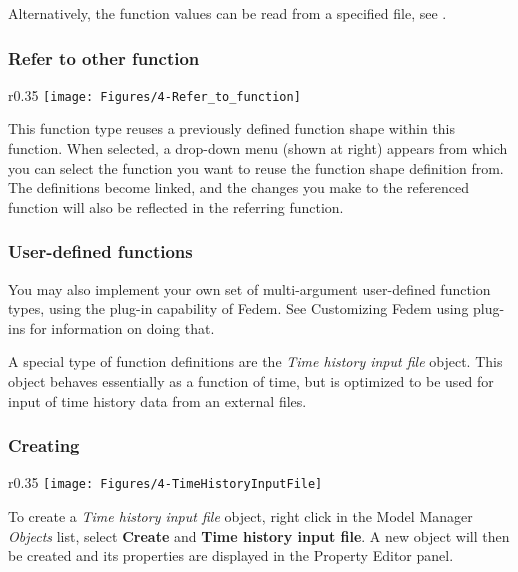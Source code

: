 Alternatively, the function values can be read from a specified file, see
.

\subsubsection{Refer to other function}

\begin{wrapfigure}[4]{r}{0.35\textwidth}
  \vspace{-5mm}
  \texttt{[image: Figures/4-Refer\_to\_function]}
\end{wrapfigure}

This function type reuses a previously defined function shape within this
function. When selected, a drop-down menu (shown at right)
appears from which you can select the function you want to reuse the
function shape definition from. The definitions become linked, and the
changes you make to the referenced function will also be reflected in
the referring function.

\subsubsection{User-defined functions}

You may also implement your own set of multi-argument user-defined
function types, using the plug-in capability of Fedem.
See 
{Customizing Fedem using plug-ins} for information on doing that.



A special type of function definitions are the {\sl Time history input file}
object. This object behaves essentially as a function of time, but is optimized
to be used for input of time history data from an external files.

\subsubsection{Creating}

\begin{wrapfigure}[5]{r}{0.35\textwidth}
  \vspace{-5mm}
  \center
  \texttt{[image: Figures/4-TimeHistoryInputFile]}
\end{wrapfigure}

To create a {\sl Time history input file} object, right click in the
Model Manager {\sl Objects} list, select \textbf{Create} and
\textbf{Time history input file}. A new object will then be created and
its properties are displayed in the Property Editor panel.

